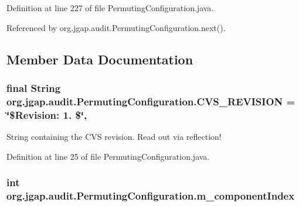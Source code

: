 Definition at line 227 of file Permuting\-Configuration.\-java.



Referenced by org.\-jgap.\-audit.\-Permuting\-Configuration.\-next().



\subsection{Member Data Documentation}
\hypertarget{classorg_1_1jgap_1_1audit_1_1_permuting_configuration_a15c333ae7737c8d084a69ea3b2257170}{
\subsubsection[{C\-V\-S\-\_\-\-R\-E\-V\-I\-S\-I\-O\-N}]{\setlength{\rightskip}{0pt plus 5cm}final String org.\-jgap.\-audit.\-Permuting\-Configuration.\-C\-V\-S\-\_\-\-R\-E\-V\-I\-S\-I\-O\-N = \char`\"{}\$Revision\-: 1. \$\char`\"{}\hspace{0.3cm}{\ttfamily [static]}, {\ttfamily [private]}}}\label{classorg_1_1jgap_1_1audit_1_1_permuting_configuration_a15c333ae7737c8d084a69ea3b2257170}
String containing the C\-V\-S revision. Read out via reflection! 

Definition at line 25 of file Permuting\-Configuration.\-java.

\hypertarget{classorg_1_1jgap_1_1audit_1_1_permuting_configuration_a5cc8b908276404490a52d4da2a9a23fd}{
\subsubsection[{m\-\_\-component\-Index}]{\setlength{\rightskip}{0pt plus 5cm}int org.\-jgap.\-audit.\-Permuting\-Configuration.\-m\-\_\-component\-Index\hspace{0.3cm}{\ttfamily [private]}}}\label{classorg_1_1jgap_1_1audit_1_1_permuting_configuration_a5cc8b908276404490a52d4da2a9a23fd}



